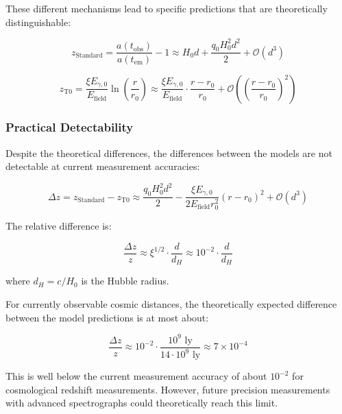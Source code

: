 \documentclass[12pt,a4paper]{article}
\theoremstyle{definition}
\begin{document}
	These different mechanisms lead to specific predictions that are theoretically distinguishable:
	
	\begin{equation}
		z_{\text{Standard}} = \frac{a(t_{\text{obs}})}{a(t_{\text{em}})} - 1 \approx H_0 d + \frac{q_0 H_0^2 d^2}{2} + \mathcal{O}(d^3)
	\end{equation}
	
	\begin{equation}
		z_{\text{T0}} = \frac{\xi E_{\gamma,0}}{E_{\text{field}}} \ln\left(\frac{r}{r_0}\right) \approx \frac{\xi E_{\gamma,0}}{E_{\text{field}}} \cdot \frac{r - r_0}{r_0} + \mathcal{O}\left(\left(\frac{r-r_0}{r_0}\right)^2\right)
	\end{equation}
	
	\subsubsection{Practical Detectability}
	
	Despite the theoretical differences, the differences between the models are not detectable at current measurement accuracies:
	
	\begin{equation}
		\Delta z = z_{\text{Standard}} - z_{\text{T0}} \approx \frac{q_0 H_0^2 d^2}{2} - \frac{\xi E_{\gamma,0}}{2E_{\text{field}}r_0^2}(r-r_0)^2 + \mathcal{O}(d^3)
	\end{equation}
	
	The relative difference is:
	
	\begin{equation}
		\frac{\Delta z}{z} \approx \xi^{1/2} \cdot \frac{d}{d_H} \approx 10^{-2} \cdot \frac{d}{d_H}
	\end{equation}
	
	where $d_H = c/H_0$ is the Hubble radius.
	
	\begin{wichtig}
		For currently observable cosmic distances, the theoretically expected difference between the model predictions is at most about:
		
		\begin{equation}
			\frac{\Delta z}{z} \approx 10^{-2} \cdot \frac{10^9 \text{ ly}}{14 \cdot 10^9 \text{ ly}} \approx 7 \times 10^{-4}
		\end{equation}
		
		This is well below the current measurement accuracy of about $10^{-2}$ for cosmological redshift measurements. However, future precision measurements with advanced spectrographs could theoretically reach this limit.
	\end{wichtig}
	
\end{document}
